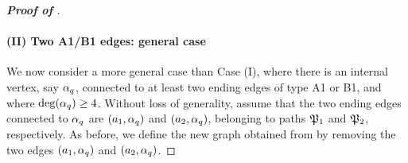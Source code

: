 \begin{proof}[\bf Proof of ]

\medskip
\paragraph{\bf (II) Two A1/B1 edges: general case} 

We now consider a more general case than Case (I), where there is an internal vertex, say $\alpha_q$, connected to at least two ending edges of type A1 or B1, and where $\deg(\alpha_q)\ge 4$. Without loss of generality, assume that the two ending edges connected to $\alpha_q$ are $(a_1,\alpha_q)$ and $(a_2,\alpha_q)$, belonging to paths $\mathfrak{P}_1$ and $\mathfrak{P}_2$, respectively. As before, we define the new graph  obtained from  by removing the two edges $(a_1,\alpha_q)$ and $(a_2,\alpha_q)$. 


\end{proof}
